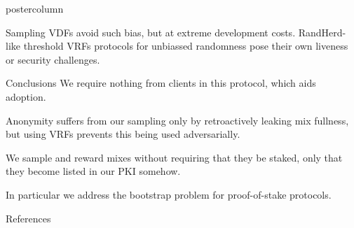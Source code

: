 \documentclass{beamer}
\begin{document}
\begin{frame}
\begin{columns}
\begin{column}{.49\textwidth}
\begin{beamercolorbox}[center,wd=\textwidth]{postercolumn}
\begin{minipage}[T]{.95\textwidth}
{\begin{block}{Sampling}
                VDFs avoid such bias, but at extreme development costs. 
                RandHerd-like threshold VRFs protocols for unbiassed randomness pose their own liveness or security challenges. \\ \bigskip
            \end{block}
            \vfill
            \begin{block}{Conclusions} %
                We require nothing from clients in this protocol, which aids adoption. \\ \bigskip \bigskip

                Anonymity suffers from our sampling only by retroactively leaking mix fullness, but using VRFs prevents this being used adversarially. \\ \bigskip \bigskip

                We sample and reward mixes without requiring that they be staked, only that they become listed in our PKI somehow.  \\ \bigskip \bigskip

                In particular we address the bootstrap problem for proof-of-stake protocols. \\ \bigskip
            \end{block}
            \vfill
            \vfill
			\begin{myblock}{References}
				\footnotesize
				
				
			\end{myblock}\vfill
          }
        \end{minipage}
      \end{beamercolorbox}
    \end{column}
  \end{columns}
\end{frame}
\end{document}
